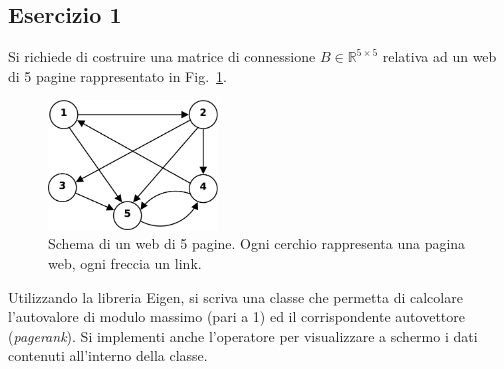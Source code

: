 \subsection*{Esercizio 1}

Si richiede di costruire una matrice di connessione $B\in \mathbb{R}^{5 \times 5}$
relativa ad un web di 5 pagine rappresentato in Fig.~\ref{fig:web}.

\begin{figure}[htbp]
    \centering
    \includegraphics[width=0.4\textwidth]{./fig/web}
    \caption{Schema di un web di 5 pagine. Ogni cerchio rappresenta
    una pagina web, ogni freccia un link.}\label{fig:web}
\end{figure}

Utilizzando la libreria Eigen, si scriva una classe che permetta di calcolare
l'autovalore di modulo massimo (pari a 1) ed il corrispondente autovettore
(\emph{pagerank}). Si implementi anche l'operatore  per
visualizzare a schermo i dati contenuti all'interno della classe.

